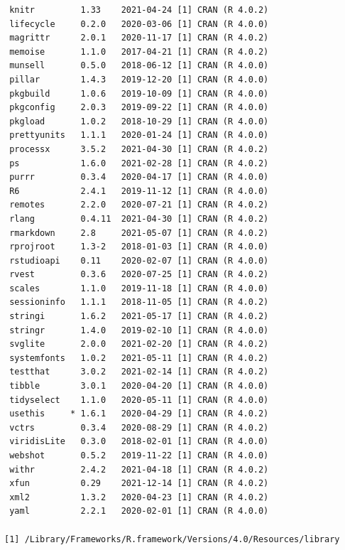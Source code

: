 \documentclass [11pt, proquest] {uwthesis}[2015/03/03]
\begin{document}
\begin{verbatim}
 knitr         1.33    2021-04-24 [1] CRAN (R 4.0.2)                       
 lifecycle     0.2.0   2020-03-06 [1] CRAN (R 4.0.0)                       
 magrittr      2.0.1   2020-11-17 [1] CRAN (R 4.0.2)                       
 memoise       1.1.0   2017-04-21 [1] CRAN (R 4.0.2)                       
 munsell       0.5.0   2018-06-12 [1] CRAN (R 4.0.0)                       
 pillar        1.4.3   2019-12-20 [1] CRAN (R 4.0.0)                       
 pkgbuild      1.0.6   2019-10-09 [1] CRAN (R 4.0.0)                       
 pkgconfig     2.0.3   2019-09-22 [1] CRAN (R 4.0.0)                       
 pkgload       1.0.2   2018-10-29 [1] CRAN (R 4.0.0)                       
 prettyunits   1.1.1   2020-01-24 [1] CRAN (R 4.0.0)                       
 processx      3.5.2   2021-04-30 [1] CRAN (R 4.0.2)                       
 ps            1.6.0   2021-02-28 [1] CRAN (R 4.0.2)                       
 purrr         0.3.4   2020-04-17 [1] CRAN (R 4.0.0)                       
 R6            2.4.1   2019-11-12 [1] CRAN (R 4.0.0)                       
 remotes       2.2.0   2020-07-21 [1] CRAN (R 4.0.2)                       
 rlang         0.4.11  2021-04-30 [1] CRAN (R 4.0.2)                       
 rmarkdown     2.8     2021-05-07 [1] CRAN (R 4.0.2)                       
 rprojroot     1.3-2   2018-01-03 [1] CRAN (R 4.0.0)                       
 rstudioapi    0.11    2020-02-07 [1] CRAN (R 4.0.0)                       
 rvest         0.3.6   2020-07-25 [1] CRAN (R 4.0.2)                       
 scales        1.1.0   2019-11-18 [1] CRAN (R 4.0.0)                       
 sessioninfo   1.1.1   2018-11-05 [1] CRAN (R 4.0.2)                       
 stringi       1.6.2   2021-05-17 [1] CRAN (R 4.0.2)                       
 stringr       1.4.0   2019-02-10 [1] CRAN (R 4.0.0)                       
 svglite       2.0.0   2021-02-20 [1] CRAN (R 4.0.2)                       
 systemfonts   1.0.2   2021-05-11 [1] CRAN (R 4.0.2)                       
 testthat      3.0.2   2021-02-14 [1] CRAN (R 4.0.2)                       
 tibble        3.0.1   2020-04-20 [1] CRAN (R 4.0.0)                       
 tidyselect    1.1.0   2020-05-11 [1] CRAN (R 4.0.0)                       
 usethis     * 1.6.1   2020-04-29 [1] CRAN (R 4.0.2)                       
 vctrs         0.3.4   2020-08-29 [1] CRAN (R 4.0.2)                       
 viridisLite   0.3.0   2018-02-01 [1] CRAN (R 4.0.0)                       
 webshot       0.5.2   2019-11-22 [1] CRAN (R 4.0.0)                       
 withr         2.4.2   2021-04-18 [1] CRAN (R 4.0.2)                       
 xfun          0.29    2021-12-14 [1] CRAN (R 4.0.2)                       
 xml2          1.3.2   2020-04-23 [1] CRAN (R 4.0.2)                       
 yaml          2.2.1   2020-02-01 [1] CRAN (R 4.0.0)                       

[1] /Library/Frameworks/R.framework/Versions/4.0/Resources/library
\end{verbatim}
\backmatter
\end{document}
